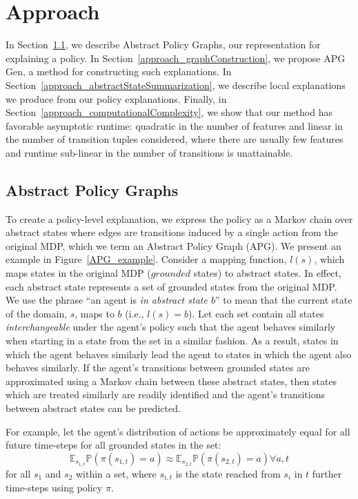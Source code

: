 \documentclass[letterpaper]{article} %
\begin{document}
\section{Approach}
In Section~\ref{approach_graphRepresentation}, we describe Abstract Policy Graphs, our representation for explaining a policy.
In Section~\ref{approach_graphConstruction}, we propose APG Gen, a method for constructing such explanations.
In Section~\ref{approach_abstractStateSummarization}, we describe local explanations we produce from our policy explanations. Finally, in Section~\ref{approach_computationalComplexity}, we show that our method has favorable asymptotic runtime: quadratic in the number of features and linear in the number of transition tuples considered, where there are usually few features and runtime sub-linear in the number of transitions is unattainable.

\subsection{Abstract Policy Graphs} \label{approach_graphRepresentation}
To create a policy-level explanation, we express the policy as a Markov chain over abstract states where edges are transitions induced by a single action from the original MDP, which we term an Abstract Policy Graph (APG). We present an example in Figure~\ref{APG_example}.
Consider a mapping function, $l(s)$, which maps states in the original MDP ($grounded$ states) to abstract states. In effect, each abstract state represents a set of grounded states from the original MDP.
We use the phrase ``an agent is \textit{in abstract state $b$}'' to mean that the current state of the domain, $s$, maps to $b$ (i.e., $l(s) = b$).
Let each set contain all states \textit{interchangeable} under the agent's policy such that the agent behaves similarly when starting in a state from the set in a similar fashion. As a result, states in which the agent behaves similarly lead the agent to states in which the agent also behaves similarly. If the agent's transitions between grounded states are approximated using a Markov chain between these abstract states, then states which are treated similarly are readily identified and the agent's transitions between abstract states can be predicted.

For example, let the agent's distribution of actions be approximately equal for all future time-steps for all grounded states in the set:
\begin{equation} \label{inter}
\mathbb{E}_{s_{1,t}} \mathbb{P}(\pi(s_{1,t}) = a) \approx \mathbb{E}_{s_{2,t}} \mathbb{P}(\pi(s_{2,t}) = a) \forall a, t
\end{equation}
for all $s_1$ and $s_2$ within a set, where $s_{i,t}$ is the state reached from $s_{i}$ in $t$ further time-steps using policy $\pi$.
\end{document}
